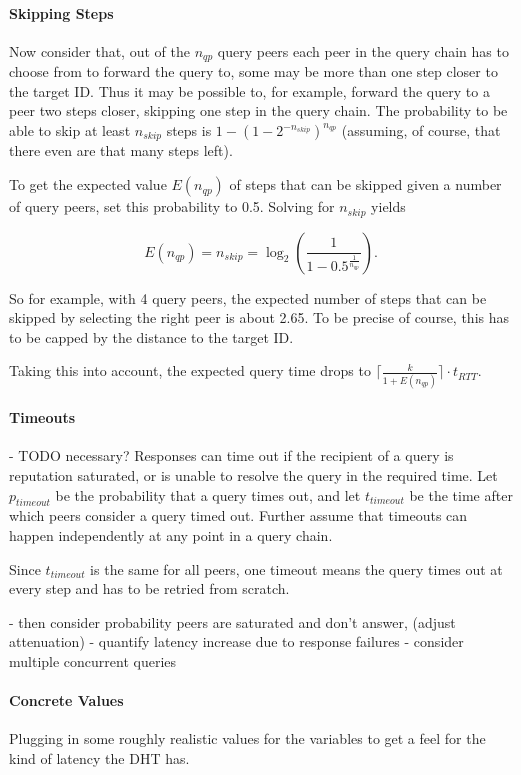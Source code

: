 \paragraph{Skipping Steps}
Now consider that, out of the $n_{qp}$ query peers each peer in the query chain
has to choose from to forward the query to, some may be more than one step
closer to the target ID. Thus it may be possible to, for example, forward the
query to a peer two steps closer, skipping one step in the query chain. The
probability to be able to skip at least $n_{skip}$ steps is $1 - (1 -
2^{-n_{skip}})^{n_{qp}}$ (assuming, of course, that there even are that many
steps left).

To get the expected value $E(n_{qp})$ of steps that can be skipped given a
number of query peers, set this probability to 0.5. Solving for $n_{skip}$
yields

\[E(n_{qp}) = n_{skip} = \log_2\left(\frac{1}{1 -
0.5^{\frac{1}{n_{qp}}}}\right).\]

So for example, with 4 query peers, the expected number of steps that can be
skipped by selecting the right peer is about 2.65. To be precise of course, this
has to be capped by the distance to the target ID.

Taking this into account, the expected query time drops to $\lceil\frac{k}{1 +
E(n_{qp})}\rceil \cdot t_{RTT}$.

\paragraph{Timeouts}
- TODO necessary?
Responses can time out if the recipient of a query is reputation saturated, or
is unable to resolve the query in the required time. Let $p_{timeout}$ be the
probability that a query times out, and let $t_{timeout}$ be the time after
which peers consider a query timed out. Further assume that timeouts can happen
independently at any point in a query chain.

Since $t_{timeout}$ is the same for all peers, one timeout means the query times
out at every step and has to be retried from scratch.

- then consider probability peers are saturated and don't answer, (adjust
  attenuation)
- quantify latency increase due to response failures
    - consider multiple concurrent queries

\paragraph{Concrete Values}
Plugging in some roughly realistic values for the variables to get a feel for
the kind of latency the \ac{DHT} has.

